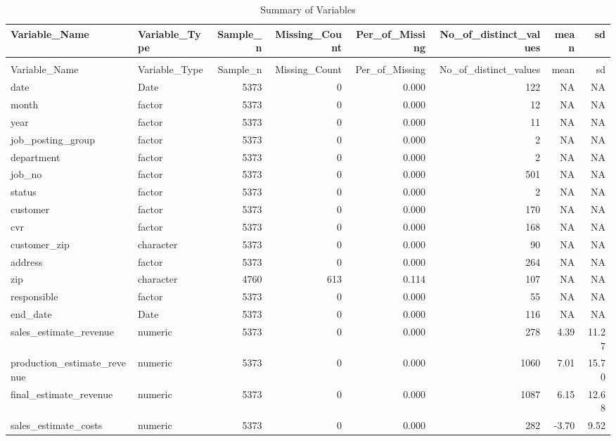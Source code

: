 \begingroup\fontsize{9}{11}\selectfont

\begin{landscape}
\begin{longtable}[t]{llrrrrrr}
\caption{Summary of Variables}\\
\toprule
Variable\_Name & Variable\_Type & Sample\_n & Missing\_Count & Per\_of\_Missing & No\_of\_distinct\_values & mean & sd\\
\midrule
\endfirsthead
\caption[]{Summary of Variables }\\
\toprule
Variable\_Name & Variable\_Type & Sample\_n & Missing\_Count & Per\_of\_Missing & No\_of\_distinct\_values & mean & sd\\
\midrule
\endhead

\endfoot
\bottomrule
\endlastfoot
date & Date & 5373 & 0 & 0.000 & 122 & NA & NA\\
month & factor & 5373 & 0 & 0.000 & 12 & NA & NA\\
year & factor & 5373 & 0 & 0.000 & 11 & NA & NA\\
job\_posting\_group & factor & 5373 & 0 & 0.000 & 2 & NA & NA\\
department & factor & 5373 & 0 & 0.000 & 2 & NA & NA\\
job\_no & factor & 5373 & 0 & 0.000 & 501 & NA & NA\\
status & factor & 5373 & 0 & 0.000 & 2 & NA & NA\\
customer & factor & 5373 & 0 & 0.000 & 170 & NA & NA\\
cvr & factor & 5373 & 0 & 0.000 & 168 & NA & NA\\
customer\_zip & character & 5373 & 0 & 0.000 & 90 & NA & NA\\
address & factor & 5373 & 0 & 0.000 & 264 & NA & NA\\
zip & character & 4760 & 613 & 0.114 & 107 & NA & NA\\
responsible & factor & 5373 & 0 & 0.000 & 55 & NA & NA\\
end\_date & Date & 5373 & 0 & 0.000 & 116 & NA & NA\\
sales\_estimate\_revenue & numeric & 5373 & 0 & 0.000 & 278 & 4.39 & 11.27\\
production\_estimate\_revenue & numeric & 5373 & 0 & 0.000 & 1060 & 7.01 & 15.70\\
final\_estimate\_revenue & numeric & 5373 & 0 & 0.000 & 1087 & 6.15 & 12.68\\
sales\_estimate\_costs & numeric & 5373 & 0 & 0.000 & 282 & -3.70 & 9.52\\

\end{longtable}
\end{landscape}

